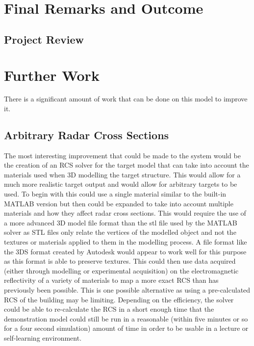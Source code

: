 \section{Final Remarks and Outcome}
\subsection{Project Review}
\section{Further Work}
There is a significant amount of work that can be done on this model to improve it. %
\subsection{Arbitrary Radar Cross Sections}
 The most interesting improvement that could be made to the system would be the creation of an RCS solver for the target model that can take into account the materials used when 3D modelling the target structure. This would allow for a much more realistic target output and would allow for arbitrary targets to be used. To begin with this could use a single material similar to the built-in MATLAB version but then could be expanded to take into account multiple materials and how they affect radar cross sections. This would require the use of a more advanced 3D model file format than the \gls{stl} file used by the MATLAB solver as STL files only relate the vertices of the modelled object and not the textures or materials applied to them in the modelling process. A file format like the 3DS format created by Autodesk would appear to work well for this purpose as this format is able to preserve textures. This could then use data acquired (either through modelling or experimental acquisition) on the electromagnetic reflectivity of a variety of materials to map a more exact RCS than has previously been possible. This is one possible alternative as using a pre-calculated RCS of the building may be limiting. Depending on the efficiency, the solver could be able to re-calculate the RCS in a short enough time that the demonstration model could still be run in a reasonable (within five minutes or so for a four second simulation) amount of time in order to be usable in a lecture or self-learning environment.
 
